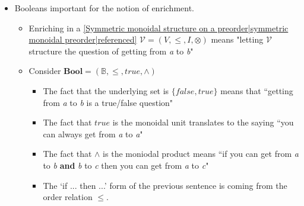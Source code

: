 \begin{itemize}
    \item Booleans important for the notion of enrichment.
          \begin{itemize}
            \item Enriching in a \ref{Symmetric monoidal structure on a preorder|symmetric monoidal preorder|referenced} $\mathcal{V}=(V,\leq,I,\otimes)$ means "letting $\mathcal{V}$ structure the question of getting from \emph{a} to \emph{b}"
            \item Consider $\mathbf{Bool}=(\mathbb{B},\leq,true,\land)$
                  \begin{itemize}
                    \item The fact that the underlying set is $\{false, true\}$ means that ``getting from \emph{a} to \emph{b} is a true/false question"
                    \item The fact that $true$ is the monoidal unit translates to the saying ``you can always get from \emph{a} to \emph{a}"
                    \item The fact that $\land$ is the moniodal product means ``if you can get from \emph{a} to \emph{b} \textbf{and} \emph{b} to \emph{c} then you can get from \emph{a} to \emph{c}"
                    \item The `if ... then ...' form of the previous sentence is coming from the order relation $\leq$.    \end{itemize}

          \end{itemize}
  \end{itemize}
